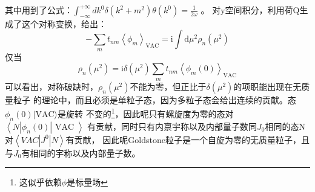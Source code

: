 \documentclass[10pt,openany]{book}
\theoremstyle{thmstyle} %
\theoremstyle{defstyle} %
\theoremstyle{prostyle} %
\begin{document}
其中用到了公式：$ \int_{-\infty}^{+\infty} d k^0 \delta\left(k^2+m^2\right) \theta\left(k^0\right)=\frac{1}{2 \omega} $ 。
对y空间积分，利用荷Q生成了这个对称变换，给出：
\begin{equation}
  -\sum_m t_{n m}\left\langle\phi_m\right\rangle_{\mathrm{VAC}}=\mathrm{i} \int \mathrm{d} \mu^2 \rho_n\left(\mu^2\right)
\end{equation}
仅当
\begin{equation}
  \rho_n\left(\mu^2\right)=\mathrm{i} \delta\left(\mu^2\right) \sum_m t_{n m}\left\langle\phi_m(0)\right\rangle_{\mathrm{VAC}}
\end{equation}
可以看出，对称破缺时，$ \rho_n\left(\mu^2\right) $不能为零，但正比于$ \delta\left(\mu^2\right) $的项职能出现在无质量粒子
的理论中，而且必须是单粒子态，因为多粒子态会给出连续的贡献。态$  \phi_n(0)|\mathrm{VAC}\rangle$是旋转
不变的\footnote{这似乎依赖$ \phi $是标量场 }，因此呢只有螺旋度为零的态对$ \left\langle N\left|\phi_n(0)\right| \text { VAC }\right\rangle $
有贡献，同时只有内禀宇称以及内部量子数同$ J_0 $相同的态N对$ \left\langle V A C\left|J^0\right| N\right\rangle $有贡献，
因此呢Goldstone粒子是一个自旋为零的无质量粒子，且与$ J_0 $有相同的宇称以及内部量子数。     




\end{document}
